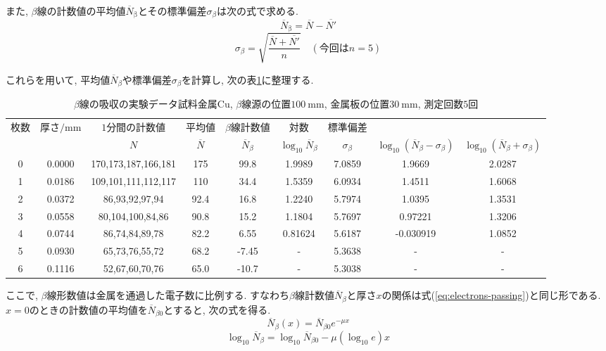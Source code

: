 \documentclass{jarticle}
\begin{document}
また, $\beta$線の計数値の平均値$\overline{N}_\mathrm{\beta}$とその標準偏差$\sigma_\beta$は次の式で求める.
\begin{equation}
  \overline{N}_\mathrm{\beta} = \overline{N} - \overline{N'}
  \label{eq:beta-passing}
\end{equation}
\begin{equation}
  \sigma_\beta = \sqrt{\frac{\overline{N} + \overline{N'}}{n}} \quad (今回はn = 5)
  \label{eq:beta-passing-log10}
\end{equation}

これらを用いて, 平均値$\overline{N}_\beta$や標準偏差$\sigma_\beta$を計算し, 次の表\ref{tb:absorption-Cu}に整理する.

\begin{table}[H]
  \caption{$\beta$線の吸収の実験データ\protect\linebreak 試料金属$\mathrm{Cu}$, $\beta$線源の位置$100\ \mathrm{mm}$, 金属板の位置$30\ \mathrm{mm}$, 測定回数$5$回}
  \label{tb:absorption-Cu}
  \small
  \hspace{-3.3cm}
  \begin{tabular}{ccccccccc}
    \hline
    枚数 & 厚さ$/\mathrm{mm}$ & $1$分間の計数値 & 平均値 & $\beta$線計数値 & 対数 & 標準偏差 & & \\
    & & $N$ & $\overline{N}$ & $\overline{N}_\beta$ & $\log_{10} \overline{N}_\beta$ & $\sigma_\beta$ & $\log_{10} (\overline{N}_\beta - \sigma_\beta)$ & $\log_{10} (\overline{N}_\beta + \sigma_\beta)$ \\
    \hline
    0 & 0.0000 & 170,173,187,166,181 & 175 & 99.8 & 1.9989 & 7.0859 & 1.9669 & 2.0287 \\
    1 & 0.0186 & 109,101,111,112,117 & 110 & 34.4 & 1.5359 & 6.0934 & 1.4511 & 1.6068 \\
    2 & 0.0372 & 86,93,92,97,94 & 92.4 & 16.8 & 1.2240 & 5.7974 & 1.0395 & 1.3531 \\
    3 & 0.0558 & 80,104,100,84,86 & 90.8 & 15.2 & 1.1804 & 5.7697 & 0.97221 & 1.3206 \\
    4 & 0.0744 & 86,74,84,89,78 & 82.2 & 6.55 & 0.81624 & 5.6187 & -0.030919 & 1.0852 \\
    5 & 0.0930 & 65,73,76,55,72 & 68.2 & -7.45 & - & 5.3638 & - & - \\
    6 & 0.1116 & 52,67,60,70,76 & 65.0 & -10.7 & - & 5.3038 & - & - \\
    \hline
  \end{tabular}
\end{table}

ここで, $\beta$線形数値は金属を通過した電子数に比例する.
すなわち$\beta$線計数値$\overline{N}_\beta$と厚さ$x$の関係は式(\ref{eq:electrons-passing})と同じ形である.
$x=0$のときの計数値の平均値を$\overline{N}_{\beta 0}$とすると, 次の式を得る.
\begin{equation}
  \overline{N}_\beta (x) = \overline{N}_{\beta 0} e^{-\mu x}
\end{equation}
\begin{equation}
  \log_{10}\overline{N}_\beta = \log_{10}\overline{N}_{\beta 0} - \mu(\log_{10}e)x
\end{equation}
\end{document}
